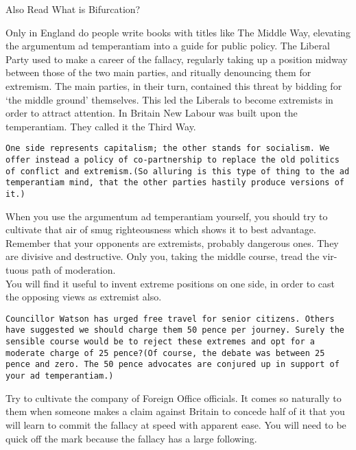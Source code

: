 \documentclass[a4paper,12pt,single,pdftex]{scrartcl}
\begin{document}
    
      

      
        Also Read  What is Bifurcation?
      
    
    
      Only in England do people write books with titles like The Middle Way, elevating the argumentum ad temperantiam into a guide for public policy. The Liberal Party used to make a career of the fallacy, regularly taking up a position midway between those of the two main parties, and ritually denouncing them for extremism. The main parties, in their turn, contained this threat by bidding for ‘the middle ground’ themselves. This led the Liberals to become extremists in order to attract attention. In Britain New Labour was built upon the temperantiam. They called it the Third Way.
    \\

    \begin{verbatim}One side represents capitalism; the other stands for socialism. We offer instead a policy of co-partnership to replace the old politics of conflict and extremism.(So alluring is this type of thing to the ad temperantiam mind, that the other parties hastily produce versions of it.)\end{verbatim}
    
      When you use the argumentum ad temperantiam yourself, you should try to cultivate that air of smug righteousness which shows it to best advantage. Remember that your opponents are extremists, probably dangerous ones. They are divisive and destructive. Only you, taking the middle course, tread the vir-tuous path of moderation.
    \\

    
      You will find it useful to invent extreme positions on one side, in order to cast the opposing views as extremist also.
    \\

    \begin{verbatim}Councillor Watson has urged free travel for senior citizens. Others have suggested we should charge them 50 pence per journey. Surely the sensible course would be to reject these extremes and opt for a moderate charge of 25 pence?(Of course, the debate was between 25 pence and zero. The 50 pence advocates are conjured up in support of your ad temperantiam.)\end{verbatim}
    
      Try to cultivate the company of Foreign Office officials. It comes so naturally to them when someone makes a claim against Britain to concede half of it that you will learn to commit the fallacy at speed with apparent ease. You will need to be quick off the mark because the fallacy has a large following.
    \\
\end{document}
